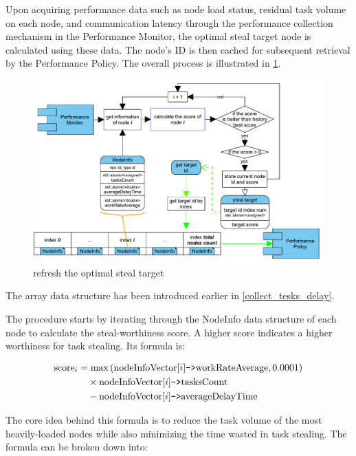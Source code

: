 \documentclass{mproj}
\begin{document}
Upon acquiring performance data such as node load status, residual task volume on each node,
and communication latency through the performance collection mechanism in the Performance Monitor,
the optimal steal target node is calculated using these data.
The node's ID is then cached for subsequent retrieval by the Performance Policy.
The overall process is illustrated in \ref{fig:refresh_target}.

\begin{figure}[h]
    \centering
    \includegraphics[width=1\textwidth]{images/refresh_target.pdf}
    \caption{refresh the optimal steal target}
    \label{fig:refresh_target}
\end{figure}
\FloatBarrier

The array data structure has been introduced earlier in \ref{collect_tesks_delay}.

The procedure starts by iterating through the NodeInfo data structure of each node to calculate the steal-worthiness score.
A higher score indicates a higher worthiness for task stealing.
Its formula is:

\begin{align}
    \text{score}_i & = \max\left(\text{nodeInfoVector}[i]\texttt{->}\text{workRateAverage}, 0.0001 \right) \notag \\
                   & \quad\times \text{nodeInfoVector}[i]\texttt{->}\text{tasksCount} \notag                      \\
                   & \quad - \text{nodeInfoVector}[i]\texttt{->}\text{averageDelayTime} \label{eq:score}
\end{align}

The core idea behind this formula is to reduce the task volume of the most heavily-loaded nodes while also minimizing the time wasted in task stealing.
The formula can be broken down into:
\end{document}

